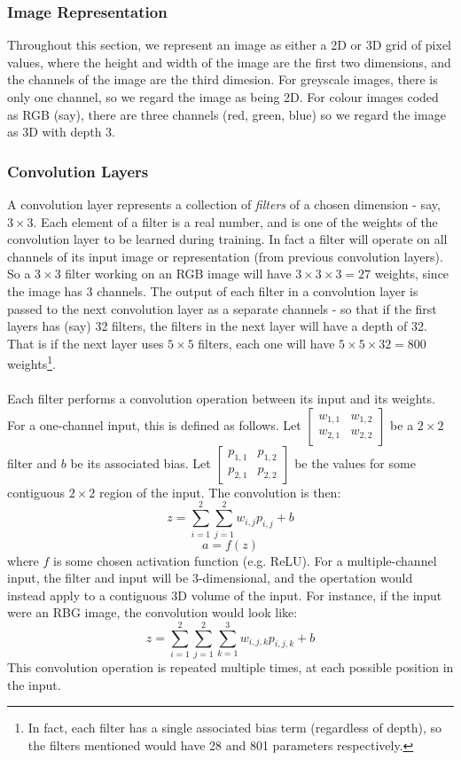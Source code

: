 \documentclass[11pt]{article} %
\theoremstyle{plain}
\theoremstyle{definition}
\begin{document}
\subsubsection{Image Representation}
Throughout this section, we represent an image as either a 2D or 3D grid of pixel values, where the height and width of the image are the first two dimensions, and the channels of the image are the third dimesion. For greyscale images, there is only one channel, so we regard the image as being 2D. For colour images coded as RGB (say), there are three channels (red, green, blue) so we regard the image as 3D with depth 3.  

\subsubsection{Convolution Layers}
A convolution layer represents a collection of \textit{filters} of a chosen dimension - say, \(3 \times 3\). Each element of a filter is a real number, and is one of the weights of the convolution layer to be learned during training. In fact a filter will operate on all channels of its input image or representation (from previous convolution layers). So a \(3 \times 3\) filter working on an RGB image will have \(3 \times 3 \times 3 = 27\) weights, since the image has 3 channels. The output of each filter in a convolution layer is passed to the next convolution layer as a separate channels - so that if the first layers has (say) 32 filters, the filters in the next layer will have a depth of 32. That is if the next layer uses \(5 \times 5\) filters, each one will have \(5 \times 5 \times 32 = 800\) weights\footnote{In fact, each filter has a single associated bias term (regardless of depth), so the filters mentioned would have 28 and 801 parameters respectively.}.    
\\
\\
\noindent
Each filter performs a convolution operation between its input and its weights. For a one-channel input, this is defined as follows. Let $[\begin{matrix}w_{1,1} & w_{1,2}\\ w_{2,1} & w_{2,2}\end{matrix}]$ be a \(2 \times 2\) filter and \(b\) be its associated bias. Let $[\begin{matrix}p_{1,1} & p_{1,2}\\ p_{2,1} & p_{2,2}\end{matrix}]$ be the values for some contiguous \(2 \times 2\) region of the input.
The convolution is then:
\[ z = \sum_{i=1}^2 \sum_{j=1}^2 w_{i,j}p_{i,j} + b \]  
\[ a = f(z) \]
where \(f\) is some chosen activation function (e.g. ReLU). For a multiple-channel input, the filter and input will be 3-dimensional, and the opertation would instead apply to a contiguous 3D volume of the input. For instance, if the input were an RBG image, the convolution would look like:
\[ z = \sum_{i=1}^2 \sum_{j=1}^2 \sum_{k=1}^3 w_{i,j,k}p_{i,j,k} + b \]
This convolution operation is repeated multiple times, at each possible position in the input.
\end{document}
